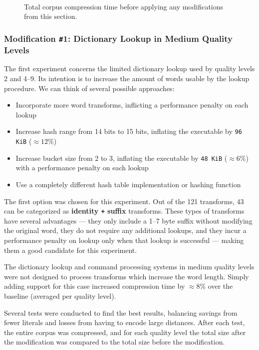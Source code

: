 \documentclass[english,master,dept460,male,cpp,cpdeclaration]{diploma}
\newcommand{\nosep}{\itemsep0em}
\newcommand{\tikzfigure}[1]{
	\tikzsetnextfilename{#1}%
}
\begin{document}
	\begin{figure}[H]
		\centering
		\tikzfigure{benchmark-unmodified}
		\\[-0pt]
		\caption{Total corpus compression time before applying any modifications from this section.}
		\label{fig:benchmark-unmodified}
	\end{figure}

		\subsubsection{Modification \texttt{\#}1: Dictionary Lookup in Medium Quality Levels}
		
		The first experiment concerns the limited dictionary lookup used by quality levels 2 and 4--9. Its intention is to increase the amount of words usable by the lookup procedure. We can think of several possible approaches:
		
		\begin{itemize} \nosep
			\item Incorporate more word transforms, inflicting a performance penalty on each lookup
			\item Increase hash range from 14 bits to 15 bits, inflating the executable by \verb|96 KiB| ($\approx 12 \%$)
			\item Increase bucket size from 2 to 3, inflating the executable by \verb|48 KiB| ($\approx 6 \%$) with a performance penalty on each lookup
			\item Use a completely different hash table implementation or hashing function
		\end{itemize}
		
		\noindent
		The first option was chosen for this experiment. Out of the 121 transforms, 43 can be categorized as \textbf{identity \texttt{+} suffix} transforms. These types of transforms have several advantages --- they only include a 1--7 byte suffix without modifying the original word, they do not require any additional lookups, and they incur a performance penalty on lookup only when that lookup is successful --- making them a good candidate for this experiment.
		
		The dictionary lookup and command processing systems in medium quality levels were not designed to process transforms which increase the word length. Simply adding support for this case increased compression time by $\approx 8 \%$ over the baseline (averaged per quality level).
		
		Several tests were conducted to find the best results, balancing savings from fewer literals and losses from having to encode large distances. After each test, the entire corpus was compressed, and for each quality level the total size after the modification was compared to the total size before the modification.
		
\end{document}
